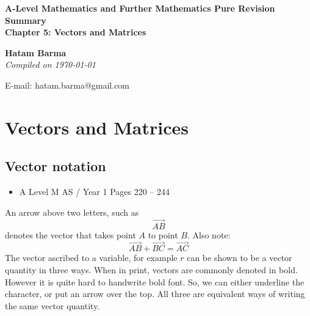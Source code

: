 \documentclass[11pt, a4paper]{article}
\begin{document}
\begin{titlepage}
   \begin{center}
       \vspace*{2.5cm}
	\huge
       \textbf{A-Level Mathematics and Further Mathematics Pure Revision Summary} \\
	\vspace{1cm}
	\Large
       \textbf{Chapter 5: Vectors and Matrices}
            
       \vspace{1.5cm}
	\LARGE
       \textbf{Hatam Barma} \\
	\vspace{0.75cm}
       \normalsize
       \emph{Compiled on \Datea\today} \\

       \vfill
        

	E-mail: hatam.barma@gmail.com
   \end{center}
\end{titlepage}


\tableofcontents

\clearpage
\section{Vectors and Matrices}
\vspace{0.5cm}

\subsection{Vector notation}
\begin{itemize}
\item A Level M AS / Year 1 \hspace{1cm} \phantom{ } Pages 220 -- 244
\end{itemize} \par
An arrow above two letters, such as
\begin{equation*}
\overrightarrow{AB}
\end{equation*}
 denotes the vector that takes point $A$ to point $B$. Also note:
\begin{equation*}
\overrightarrow{AB}+\overrightarrow{BC}=\overrightarrow{AC}
\end{equation*}
The vector ascribed to a variable, for example $r$ can be shown to be a vector quantity in three ways. When in print, vectors are commonly denoted in bold. However it is quite hard to handwrite bold font. So, we can either underline the character, or put an arrow over the top. All three are equivalent ways of writing the same vector quantity.
\end{document}
